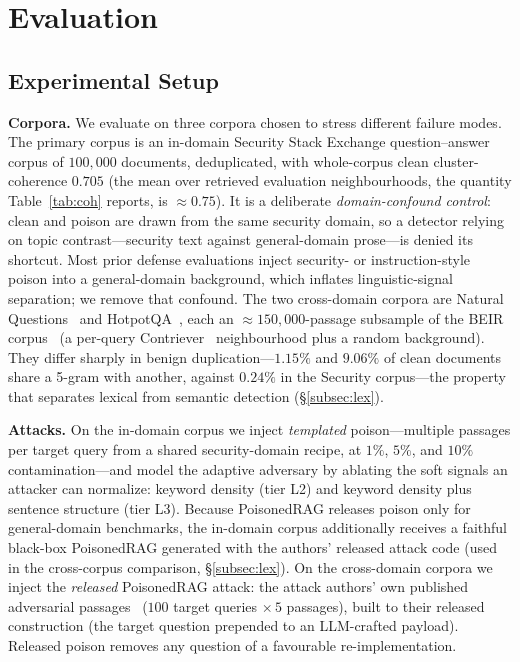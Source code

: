 \documentclass[conference]{IEEEtran}
\begin{document}
\section{Evaluation}
\label{sec:eval}
\subsection{Experimental Setup}

\noindent\textbf{Corpora.} We evaluate on three corpora chosen to stress
different failure modes. The primary corpus is an in-domain Security Stack
Exchange question--answer corpus of $100{,}000$ documents, deduplicated, with
whole-corpus clean cluster-coherence $0.705$ (the mean over retrieved evaluation
neighbourhoods, the quantity Table~\ref{tab:coh} reports, is $\approx\!0.75$).
It is a deliberate \emph{domain-confound control}: clean and poison are drawn from
the same security domain, so a detector relying on topic contrast---security text
against general-domain prose---is denied its shortcut. Most prior defense
evaluations inject security- or instruction-style poison into a general-domain
background, which inflates linguistic-signal separation; we remove that confound.
The two cross-domain corpora are Natural Questions~\cite{nq} and
HotpotQA~\cite{hotpotqa}, each an $\approx\!150{,}000$-passage subsample of the
BEIR corpus~\cite{beir} (a per-query Contriever~\cite{contriever} neighbourhood plus
a random background). They differ sharply in benign duplication---$1.15\%$ and $9.06\%$ of
clean documents share a 5-gram with another, against $0.24\%$ in the Security
corpus---the property that separates lexical from semantic detection
(\S\ref{subsec:lex}).

\noindent\textbf{Attacks.} On the in-domain corpus we inject \emph{templated}
poison---multiple passages per target query from a shared security-domain recipe,
at $1\%$, $5\%$, and $10\%$ contamination---and model the adaptive adversary by
ablating the soft signals an attacker can normalize: keyword density (tier L2) and
keyword density plus sentence structure (tier L3). Because PoisonedRAG releases
poison only for general-domain benchmarks, the in-domain corpus additionally
receives a faithful black-box PoisonedRAG generated with the authors' released
attack code (used in the cross-corpus comparison, \S\ref{subsec:lex}). On the
cross-domain corpora we inject the \emph{released} PoisonedRAG attack: the attack
authors' own published
adversarial passages~\cite{poisonedrag} ($100$ target queries $\times\,5$
passages), built to their released construction (the target question prepended to
an LLM-crafted payload). Released poison removes any question of a favourable
re-implementation.
\end{document}
